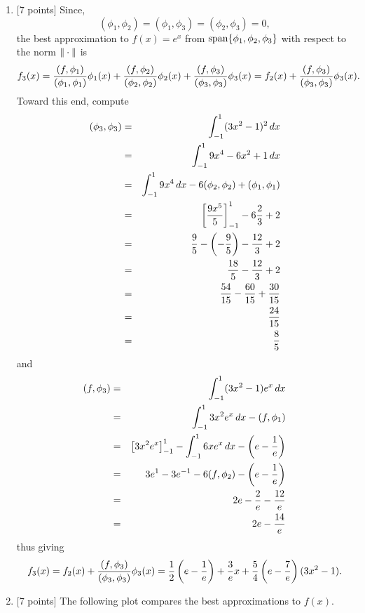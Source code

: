 \begin{solution}
\begin{enumerate}
\item {[7 points]}
Since,
 \[ (\phi_1,\phi_2) = (\phi_1,\phi_3) = (\phi_2,\phi_3) = 0,\]
the best approximation to $f(x) = e^x$ from ${\rm span}\{\phi_1,\phi_2,\phi_3\}$ with respect to the norm $\|\cdot\|$ is
       \[ f_3(x) = {(f,\phi_1) \over (\phi_1, \phi_1)} \phi_1(x) + {(f,\phi_2) \over (\phi_2, \phi_2)} \phi_2(x) + {(f,\phi_3) \over (\phi_3, \phi_3)} \phi_3(x) = f_2(x) + {(f,\phi_3) \over (\phi_3, \phi_3)} \phi_3(x).\]
Toward this end, compute
\begin{eqnarray*}
  (\phi_3,\phi_3) &=& \int_{-1}^1 (3x^2-1)^2\,dx
\\
 &=& \int_{-1}^1 9x^4-6x^2+1\,dx
\\
 &=& \int_{-1}^1 9x^4\,dx-6(\phi_2,\phi_2) +(\phi_1,\phi_1)
\\
 &=& \left[{9x^5\over 5}\right]_{-1}^1-6{2\over 3} +2
\\
 &=& {9\over 5}-\left(-{9\over 5}\right)-{12\over 3} +2
\\
 &=& {18\over 5}-{12\over 3} +2
\\
 &=& {54\over 15}-{60\over 15} +{30\over 15}
\\
 &=& {24\over 15}
\\
 &=& {8\over 5}
\end{eqnarray*}
and
\begin{eqnarray*}
(f,\phi_3) &=& \int_{-1}^1 (3x^2-1)e^x\,dx
\\
&=& \int_{-1}^1 3x^2e^x\,dx-(f,\phi_1)
\\
 &=& \left[3x^2e^x\right]_{-1}^1-\int_{-1}^1 6xe^x\,dx-\left(e-{1\over e}\right)
\\
 &=& 3e^1-3e^{-1}-6(f,\phi_2)-\left(e-{1\over e}\right)
\\
 &=& 2e-{2\over e}-{12\over e}
\\
 &=& 2e-{14\over e}
\end{eqnarray*}
thus giving
       \[ f_3(x) = f_2(x) + {(f,\phi_3) \over (\phi_3, \phi_3)} \phi_3(x) = {1\over 2}\left(e-{1\over e}\right)
                  + {3\over e}x + {5\over 4} \left(e-{7\over e}\right) (3x^2-1) .\]

\item {[7 points]} The following plot compares the best approximations to $f(x)$.


\end{enumerate}
\end{solution}
